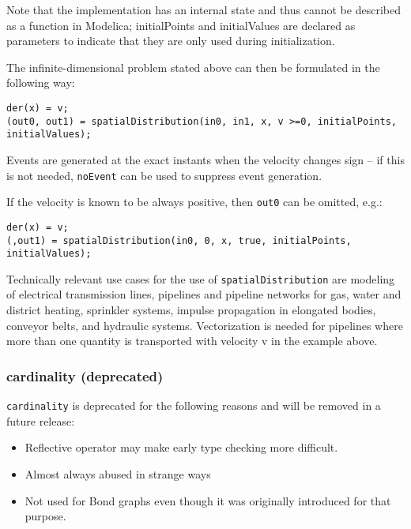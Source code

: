 \begin{nonnormative}
Note that the implementation has an internal state and thus
cannot be described as a function in Modelica; initialPoints and
initialValues are declared as parameters to indicate that they are only
used during initialization.

The infinite-dimensional problem stated above can then be formulated in the following way:
\begin{lstlisting}[language=modelica]
der(x) = v;
(out0, out1) = spatialDistribution(in0, in1, x, v >=0, initialPoints, initialValues);
\end{lstlisting}

Events are generated at the exact instants when the velocity
changes sign -- if this is not needed, \lstinline!noEvent! can be used to
suppress event generation.

If the velocity is known to be always positive, then \lstinline!out0! can be omitted, e.g.:
\begin{lstlisting}[language=modelica]
der(x) = v;
(,out1) = spatialDistribution(in0, 0, x, true, initialPoints, initialValues);
\end{lstlisting}
Technically relevant use cases for the use of
\lstinline!spatialDistribution! are modeling of electrical
transmission lines, pipelines and pipeline networks for gas, water and
district heating, sprinkler systems, impulse propagation in elongated
bodies, conveyor belts, and hydraulic systems. Vectorization is needed
for pipelines where more than one quantity is transported with velocity
v in the example above.
\end{nonnormative}

\subsubsection{cardinality (deprecated)}\label{cardinality-deprecated}

\begin{nonnormative}
\lstinline!cardinality! is deprecated for the following reasons and will be removed in a future release:
\begin{itemize}
\item
  Reflective operator may make early type checking more difficult.
\item
  Almost always abused in strange ways
\item
  Not used for Bond graphs even though it was originally introduced for that purpose.
\end{itemize}
\end{nonnormative}

